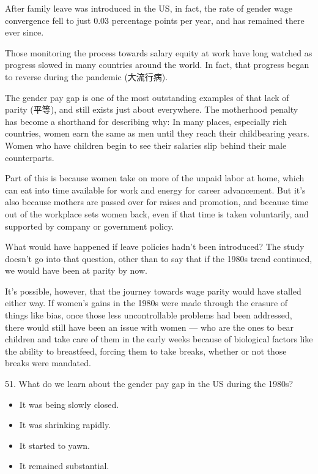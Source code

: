 \documentclass[UTF8,11pt]{ctexart}
\begin{document}
After family leave was introduced in the US, in fact, the rate of gender wage convergence fell to just 0.03 percentage points per year, and has remained there ever since.


Those monitoring the process towards salary equity at work have long watched as progress slowed in many countries around the world. In fact, that progress began to reverse during the pandemic (大流行病).


The gender pay gap is one of the most outstanding examples of that lack of parity (平等), and still exists just about everywhere. The motherhood penalty has become a shorthand for describing why: In many places, especially rich countries, women earn the same as men until they reach their childbearing years. Women who have children begin to see their salaries slip behind their male counterparts.


Part of this is because women take on more of the unpaid labor at home, which can eat into time available for work and energy for career advancement. But it’s also because mothers are passed over for raises and promotion, and because time out of the workplace sets women back, even if that time is taken voluntarily, and supported by company or government policy.


What would have happened if leave policies hadn’t been introduced? The study doesn’t go into that question, other than to say that if the 1980s trend continued, we would have been at parity by now.


It’s possible, however, that the journey towards wage parity would have stalled either way. If women’s gains in the 1980s were made through the erasure of things like bias, once those less uncontrollable problems had been addressed, there would still have been an issue with women — who are the ones to bear children and take care of them in the early weeks because of biological factors like the ability to breastfeed, forcing them to take breaks, whether or not those breaks were mandated.


51. What do we learn about the gender pay gap in the US during the 1980s?


\begin{itemize}[leftmargin=2em,itemsep=.2em,topsep=.4em]\item[A.] It was being slowly closed.
\item[B.] It was shrinking rapidly.
\item[C.] It started to yawn.
\item[D.] It remained substantial.
\end{itemize}
\end{document}
